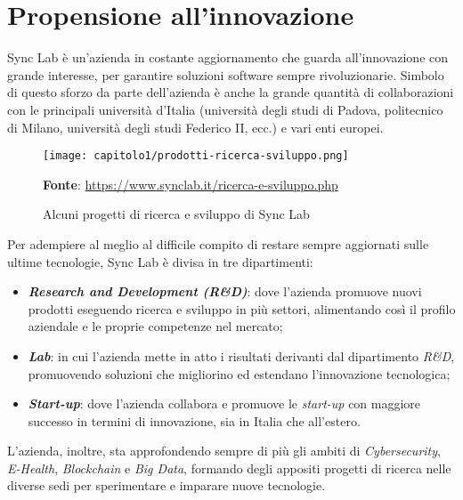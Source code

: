 
\section{Propensione all'innovazione}
Sync Lab è un'azienda in costante aggiornamento che guarda all'innovazione con grande interesse, per garantire soluzioni software sempre rivoluzionarie. Simbolo di questo sforzo da parte dell'azienda è anche la grande quantità di collaborazioni con le principali università d'Italia (università degli studi di Padova, politecnico di Milano, università degli studi Federico II, ecc.) e vari enti europei. \\

\begin{figure}[!h]
  \centering
  \texttt{[image: capitolo1/prodotti-ricerca-sviluppo.png]}
  \caption{Alcuni progetti di ricerca e sviluppo di Sync Lab}
  \textbf{Fonte}: \href{https://www.synclab.it/ricerca-e-sviluppo.php}{https://www.synclab.it/ricerca-e-sviluppo.php}
\end{figure}

Per adempiere al meglio al difficile compito di restare sempre aggiornati sulle ultime tecnologie, Sync Lab è divisa in tre dipartimenti:
\begin{itemize}
  \item \textbf{\textit{Research and Development (R\&D)}}: dove l'azienda promuove nuovi prodotti eseguendo ricerca e sviluppo in più settori, alimentando così il profilo aziendale e le proprie competenze nel mercato;
  \item \textbf{\textit{Lab}}: in cui l'azienda mette in atto i risultati derivanti dal dipartimento \textit{R\&D}, promuovendo soluzioni che migliorino ed estendano l'innovazione tecnologica;
  \item \textbf{\textit{Start-up}}: dove l'azienda collabora e promuove le \textit{start-up} con maggiore successo in termini di innovazione, sia in Italia che all'estero.
\end{itemize}  

L'azienda, inoltre, sta approfondendo sempre di più gli ambiti di \textit{Cybersecurity}, \textit{E-Health}, \textit{Blockchain} e \textit{Big Data}, formando degli appositi progetti di ricerca nelle diverse sedi per sperimentare e imparare nuove tecnologie. \\

